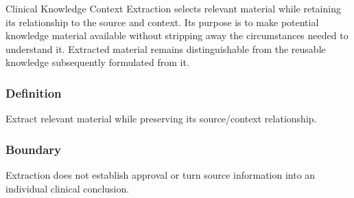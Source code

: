 Clinical Knowledge Context Extraction selects relevant material while retaining its relationship to the source and context. Its purpose is to make potential knowledge material available without stripping away the circumstances needed to understand it. Extracted material remains distinguishable from the reusable knowledge subsequently formulated from it.

\subsubsection*{Definition}

Extract relevant material while preserving its source/\allowbreak{}context relationship.

\subsubsection*{Boundary}

Extraction does not establish approval or turn source information into an individual clinical conclusion.

